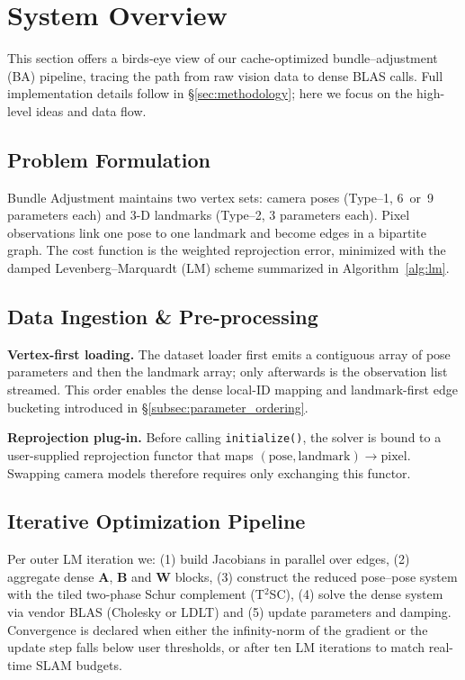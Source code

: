 \section{System Overview}
This section offers a birds‐eye view of our cache-optimized bundle–adjustment (BA) pipeline, tracing the 
path from raw vision data to dense BLAS calls.  Full implementation details follow in \S\ref{sec:methodology}; 
here we focus on the high-level ideas and data flow.

\subsection{Problem Formulation}
Bundle Adjustment maintains two vertex sets: camera poses (Type--1, 6~or~9 parameters each) and 3-D landmarks 
(Type--2, 3 parameters each).  Pixel observations link one pose to one landmark and become edges in a bipartite 
graph.  The cost function is the weighted reprojection error, minimized with the damped Levenberg--Marquardt (LM)
scheme summarized in Algorithm~\ref{alg:lm}.

\subsection{Data Ingestion \& Pre-processing}
\textbf{Vertex-first loading.}  The dataset loader first emits a contiguous array of pose parameters and then the 
landmark array; only afterwards is the observation list streamed.  This order enables the dense local-ID mapping 
and landmark-first edge bucketing introduced in \S\ref{subsec:parameter_ordering}.

\textbf{Reprojection plug-in.}  Before calling \texttt{initialize()}, the solver is bound to a user-supplied 
reprojection functor that maps $(\text{pose},\text{landmark})\!\rightarrow\!\text{pixel}$.  Swapping camera models 
therefore requires only exchanging this functor.

\subsection{Iterative Optimization Pipeline}
Per outer LM iteration we: (1) build Jacobians in parallel over edges, (2) aggregate dense $\mathbf{A}$, $\mathbf{B}$ 
and $\mathbf{W}$ blocks, (3) construct the reduced pose–pose system with the tiled two-phase Schur complement (T$^{2}$SC), 
(4) solve the dense system via vendor BLAS (Cholesky or LDLT) and (5) update parameters and damping.  Convergence is 
declared when either the infinity-norm of the gradient or the update step falls below user thresholds, or after ten LM 
iterations to match real-time SLAM budgets.

